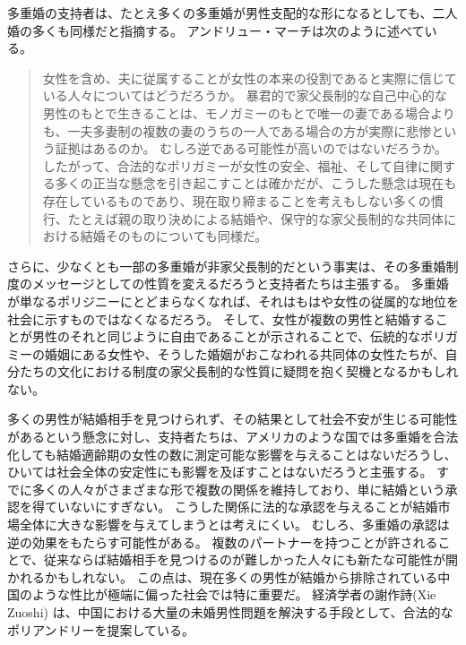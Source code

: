 \documentclass[paper=a4,book,openany]{jlreq}
\begin{document}
多重婚の支持者は、たとえ多くの多重婚が男性支配的な形になるとしても、二人婚の多くも同様だと指摘する。
アンドリュー・マーチは次のように述べている。

\begin{quote}
女性を含め、夫に従属することが女性の本来の役割であると実際に信じている人々についてはどうだろうか。
暴君的で家父長制的な自己中心的な男性のもとで生きることは、モノガミーのもとで唯一の妻である場合よりも、一夫多妻制の複数の妻のうちの一人である場合の方が実際に悲惨という証拠はあるのか。
むしろ逆である可能性が高いのではないだろうか。
したがって、合法的なポリガミーが女性の安全、福祉、そして自律に関する多くの正当な懸念を引き起こすことは確かだが、こうした懸念は現在も存在しているものであり、現在取り締まることを考えもしない多くの慣行、たとえば親の取り決めによる結婚や、保守的な家父長制的な共同体における結婚そのものについても同様だ。
\citep[p.260]{march11:_is_there_right_polyg}
\end{quote}

さらに、少なくとも一部の多重婚が非家父長制的だという事実は、その多重婚制度のメッセージとしての性質を変えるだろうと支持者たちは主張する。
多重婚が単なるポリジニーにとどまらなくなれば、それはもはや女性の従属的な地位を社会に示すものではなくなるだろう。
そして、女性が複数の男性と結婚することが男性のそれと同じように自由であることが示されることで、伝統的なポリガミーの婚姻にある女性や、そうした婚姻がおこなわれる共同体の女性たちが、自分たちの文化における制度の家父長制的な性質に疑問を抱く契機となるかもしれない。

多くの男性が結婚相手を見つけられず、その結果として社会不安が生じる可能性があるという懸念に対し、支持者たちは、アメリカのような国では多重婚を合法化しても結婚適齢期の女性の数に測定可能な影響を与えることはないだろうし、ひいては社会全体の安定性にも影響を及ぼすことはないだろうと主張する。
すでに多くの人々がさまざまな形で複数の関係を維持しており、単に結婚という承認を得ていないにすぎない。
こうした関係に法的な承認を与えることが結婚市場全体に大きな影響を与えてしまうとは考えにくい。
むしろ、多重婚の承認は逆の効果をもたらす可能性がある。
複数のパートナーを持つことが許されることで、従来ならば結婚相手を見つけるのが難しかった人々にも新たな可能性が開かれるかもしれない。
この点は、現在多くの男性が結婚から排除されている中国のような性比が極端に偏った社会では特に重要だ。
経済学者の謝作詩(Xie Zuoshi) は、中国における大量の未婚男性問題を解決する手段として、合法的なポリアンドリーを提案している\citep{weller15:_econom_has_contr_solut_china}。
\end{document}
